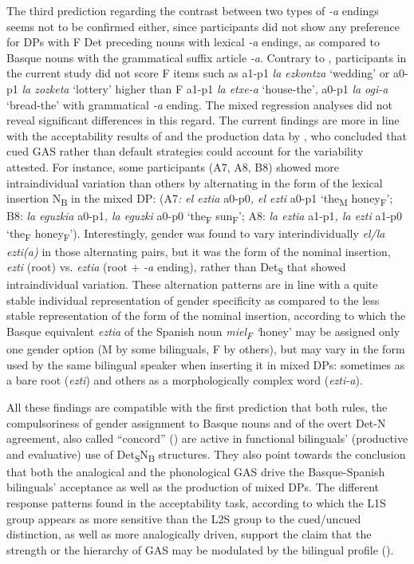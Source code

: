 \documentclass[output=paper]{langscibook}
\begin{document}
The third prediction regarding the contrast between two types of \textit{-a} endings seems not to be confirmed either, since participants did not show any preference for DPs with F Det preceding nouns with lexical \textit{{}-a} endings, as compared to Basque nouns with the grammatical suffix article \textit{-a}. Contrary to \citet{BadiolaSande2018}, participants in the current study did not score F items such as a1-p1 \textit{la ezkontza} ‘wedding’ or a0-p1 \textit{la zozketa} ‘lottery’ higher than F a1-p1 \textit{la etxe-a} ‘house-the’, a0-p1 \textit{la ogi-a} ‘bread-the’ with grammatical \textit{-a} ending. The mixed regression analyses did not reveal significant differences in this regard. The current findings are more in line with the acceptability results of \citet{ParafitaCoutoEtAl2015basque} and the production data by \citet{Munarriz-IbarrolaEtAl2022}, who concluded that cued GAS rather than default strategies could account for the variability attested. For instance, some participants (A7, A8, B8) showed more intraindividual variation than others by alternating in the form of the lexical insertion N\textsubscript{B} in the mixed DP: (A7\textit{: el eztia} a0-p0\textit{, el ezti} a0-p1 ‘the\textsubscript{M} honey\textsubscript{F}’; B8: \textit{la eguzkia} a0-p1\textit{, la eguzki} a0-p0 ‘the\textsubscript{F} sun\textsubscript{F}’; A8: \textit{la eztia} a1-p1\textit{, la ezti} a1-p0 ‘the\textsubscript{F} honey\textsubscript{F}’). Interestingly, gender was found to vary interindividually \textit{el/la ezti(a)} in those alternating pairs, but it was the form of the nominal insertion, \textit{ezti} (root) vs. \textit{eztia} (root + \textit{{}-a} ending), rather than Det\textsubscript{S} that showed intraindividual variation. These alternation patterns are in line with a quite stable individual representation of gender specificity as compared to the less stable representation of the form of the nominal insertion, according to which the Basque equivalent \textit{eztia} of the Spanish noun \textit{miel\textsubscript{F}} \textit{‘}honey’ may be assigned only one gender option (M by some bilinguals, F by others), but may vary in the form used by the same bilingual speaker when inserting it in mixed DPs: sometimes as a bare root (\textit{ezti}) and others as a morphologically complex word (\textit{ezti-a}).

All these findings are compatible with the first prediction that both rules, the compulsoriness  of gender assignment to Basque nouns and of the overt Det-N agreement,  also called “concord” (\citealt{LicerasFernándezFuertes2018}) are active in functional bilinguals’ (productive and evaluative) use of Det\textsubscript{S}N\textsubscript{B} structures. They also point towards the conclusion that both the analogical and the phonological GAS drive the Basque-Spanish bilinguals’ acceptance as well as the production of mixed DPs.  The different response patterns found in the acceptability task, according to which the L1S group appears as more sensitive than the L2S group to the cued/uncued distinction, as well as more analogically driven, support the claim that the strength or the hierarchy of GAS may be modulated by the bilingual profile (\citealt{LicerasEtAl2008,Munarriz-IbarrolaEtAl2022,ValdésKroffEtAl2017}).
\end{document}

